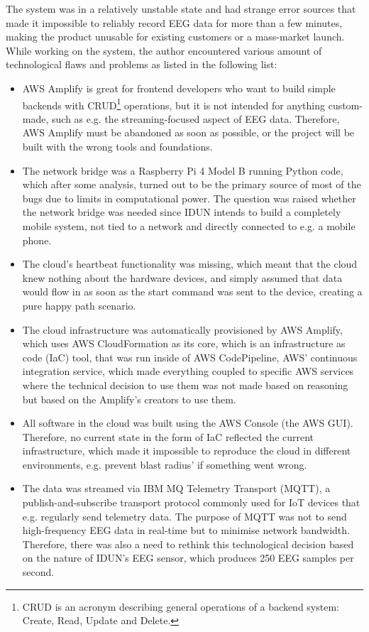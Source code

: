 The system was in a relatively unstable state and had strange error sources that made it impossible to reliably record EEG data for more than a few minutes, making the product unusable for existing customers or a mass-market launch. While working on the system, the author encountered various amount of technological flaws and problems as listed in the following list:

\begin{itemize}

\item AWS Amplify is great for frontend developers who want to build simple backends with CRUD\footnote{CRUD is an acronym describing general operations of a backend system: Create, Read, Update and Delete.} operations, but it is not intended for anything custom-made, such as e.g. the streaming-focused aspect of EEG data. Therefore, AWS Amplify must be abandoned as soon as possible, or the project will be built with the wrong tools and foundations.
\item The network bridge was a Raspberry Pi 4 Model B running Python code, which after some analysis, turned out to be the primary source of most of the bugs due to limits in computational power. The question was raised whether the network bridge was needed since IDUN intends to build a completely mobile system, not tied to a network and directly connected to e.g. a mobile phone.
\item The cloud's heartbeat functionality was missing, which meant that the cloud knew nothing about the hardware devices, and simply assumed that data would flow in as soon as the start command was sent to the device, creating a pure happy path scenario.
\item The cloud infrastructure was automatically provisioned by AWS Amplify, which uses AWS CloudFormation as its core, which is an infrastructure as code (IaC) tool, that was run inside of AWS CodePipeline, AWS' continuous integration service, which made everything coupled to specific AWS services where the technical decision to use them was not made based on reasoning but based on the Amplify's creators to use them.
\item All software in the cloud was built using the AWS Console (the AWS GUI). Therefore, no current state in the form of IaC reflected the current infrastructure, which made it impossible to reproduce the cloud in different environments, e.g. prevent blast radius' if something went wrong.
\item The data was streamed via IBM MQ Telemetry Transport (MQTT), a publish-and-subscribe transport protocol commonly used for IoT devices that e.g. regularly send telemetry data. The purpose of MQTT was not to send high-frequency EEG data in real-time but to minimise network bandwidth. Therefore, there was also a need to rethink this technological decision based on the nature of IDUN's EEG sensor, which produces 250 EEG samples per second.

\end{itemize}
